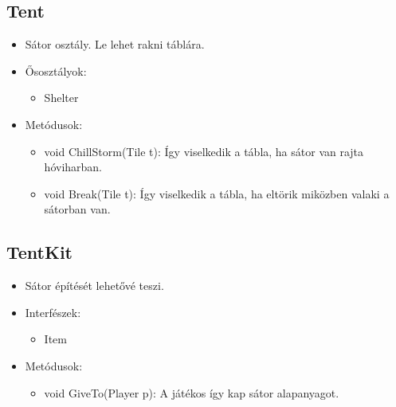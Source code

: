 \subsection{Tent}
\begin{itemize}
	\item Sátor osztály. Le lehet rakni táblára.
	\item Ősosztályok:
	\begin{itemize}
		\item Shelter
	\end{itemize}
	\item Metódusok:
	\begin{itemize}
		\item void ChillStorm(Tile t): Így viselkedik a tábla, ha sátor van  rajta hóviharban.
		\item void Break(Tile t): Így viselkedik a tábla, ha eltörik miközben valaki a sátorban van.
	\end{itemize}
\end{itemize}

\subsection{TentKit}
\begin{itemize}
	\item Sátor építését lehetővé teszi.
	\item Interfészek:
	\begin{itemize}
		\item Item
	\end{itemize}
	\item Metódusok:
	\begin{itemize}
		\item void GiveTo(Player p): A játékos így kap sátor alapanyagot.
	\end{itemize}
\end{itemize}

